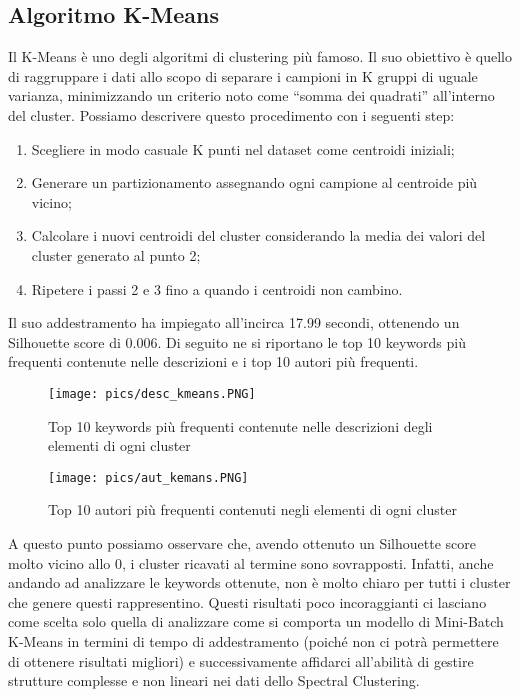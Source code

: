 \documentclass[12pt,oneside]{article}
\begin{document}
    \begin{enumerate}
    \newpage
    \subsection{Algoritmo K-Means}
    \begin{justify}
        Il K-Means è uno degli algoritmi di clustering più famoso. Il suo obiettivo è quello di raggruppare i dati allo scopo di separare i campioni in K gruppi di uguale varianza, minimizzando un criterio noto come “somma dei quadrati” all'interno del cluster. Possiamo descrivere questo procedimento con i seguenti step:
        \begin{enumerate}[label=\arabic*)]
            \item Scegliere in modo casuale K punti nel dataset come centroidi iniziali;
            \item Generare un partizionamento assegnando ogni campione al centroide più vicino;
            \item Calcolare i nuovi centroidi del cluster considerando la media dei valori del cluster generato al punto 2;
            \item Ripetere i passi 2 e 3 fino a quando i centroidi non cambino.
        \end{enumerate}
        Il suo addestramento ha impiegato all’incirca 17.99 secondi, ottenendo un Silhouette score di 0.006. Di seguito ne si riportano le top 10 keywords più frequenti contenute nelle descrizioni e i top 10 autori più frequenti.
        \end{justify}

        \begin{figure}[H]
        \texttt{[image: pics/desc\_kmeans.PNG]}
        \captionsetup{width=0.90\textwidth, justification=centering}
        \caption{Top 10 keywords più frequenti contenute nelle descrizioni degli elementi di ogni cluster}
        \end{figure}

        \begin{figure}[H]
        \texttt{[image: pics/aut\_kemans.PNG]}
        \caption{Top 10 autori più frequenti contenuti negli elementi di ogni cluster}
        \end{figure}
        
        \begin{justify}
        A questo punto possiamo osservare che, avendo ottenuto un Silhouette score molto vicino allo 0, i cluster ricavati al termine sono sovrapposti. Infatti, anche andando ad analizzare le keywords ottenute, non è molto chiaro per tutti i cluster che genere questi rappresentino. Questi risultati poco incoraggianti ci lasciano come scelta solo quella di analizzare come si comporta un modello di Mini-Batch K-Means in termini di tempo di addestramento (poiché non ci potrà permettere di ottenere risultati migliori) e successivamente affidarci all’abilità di gestire strutture complesse e non lineari nei dati dello Spectral Clustering.
    \end{justify}
    \end{enumerate}
\end{document}
